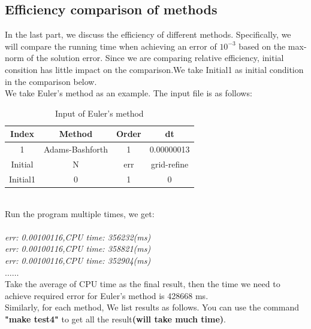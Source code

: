 \documentclass[a4paper,twocolumn]{article}
\theoremstyle{definition}
\begin{document}
\subsection{Efficiency comparison of methods}
In the last part, we discuss the efficiency of different methods. Specifically, we will compare the running time when achieving an error of $10^{-3}$ based on the max-norm of the solution error. Since we are comparing relative efficiency, initial consition has little impact on the comparison.We take Initial1 as initial condition in the comparison below.\\
We take Euler's method as an example. The input file is as follows:
\begin{table}[!htp]
	\centering
	\begin{tabular}{|c|c|c|c|}
		\hline	
		Index & Method & Order & dt \\
		\hline		
		1 & Adams-Bashforth & 1 & 0.00000013   \\	
		\hline \hline
		Initial & N & err & grid-refine \\
		\hline
		Initial1 & 0 & 1 & 0 \\
		\hline
	\end{tabular}
	\caption{Input of Euler's method }
	\label{tab:4}
\end{table}\\
Run the program multiple times, we get:\\\\
\emph{err: 0.00100116,CPU time: 356232(ms)}\\
\emph{err: 0.00100116,CPU time: 358821(ms)}\\
\emph{err: 0.00100116,CPU time: 352904(ms)}\\
\emph{$\dots\dots$ }\\
\newpage
\noindent Take the average of CPU time as the final result, then the time we need to achieve required error for Euler's method is 428668 ms.\\
Similarly, for each method, We list results as follows. You can use the command \textbf{"make test4"} to get all the result\textbf{(will take much time)}. 
\end{document}
